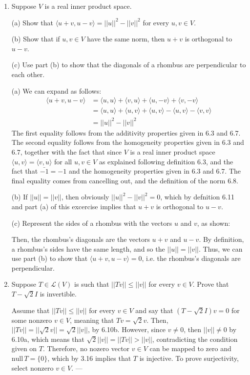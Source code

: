 \documentclass{book}
\begin{document}
\begin{enumerate}
\item Suppose \(V\) is a real inner product space.

(a) Show that \(\langle u+v,u-v \rangle = ||u||^2-||v||^2\) for every \(u,v \in V\).

(b) Show that if \(u,v \in V\) have the same norm, then \(u+v\) is orthogonal to \(u-v\).

(c) Use part (b) to show that the diagonals of a rhombus are perpendicular to each other.

(a) We can expand as follows: 
\begin{align*}
\langle u+v,u-v \rangle &= \langle u,u \rangle + \langle v,u \rangle + \langle u,-v \rangle + \langle v,-v \rangle \\
&= \langle u,u \rangle +\langle u,v \rangle + \langle u,v \rangle - \langle u,v \rangle - \langle v,v \rangle \\
&= ||u||^2 - ||v||^2
\end{align*}
The first equality follows from the additivity properties given in 6.3 and 6.7.  The second equality follows from the homogeneity properties given in 6.3 and 6.7, together with the fact that since \(V\) is a real inner product space \(\langle u,v \rangle = \langle v,u \rangle\) for all \(u,v \in V\) as explained following definition 6.3, and the fact that \(\bar{-1}=-1\) and the homogeneity properties given in 6.3 and 6.7.  The final equality comes from cancelling out, and the definition of the norm 6.8.

(b) If \(||u||=||v||\), then obviously \(||u||^2 - ||v||^2=0\), which by defnition 6.11 and part (a) of this excercise implies that \(u+v\) is orthogonal to \(u-v\).

(c) Represent the sides of a rhombus with the vectors \(u\) and \(v\), as shown:

Then, the rhombus's diagonals are the vectors \(u+v\) and \(u-v\).  By definition, a rhombus's sides have the same length, and so the \(||u||=||v||\).  Thus, we can use part (b) to show that \(\langle u+v,u-v \rangle=0\), i.e. the rhombus's diagonals are perpendicular.

\item Suppose \(T \in \mathcal{L}(V)\) is such that \(||Tv|| \leq ||v||\) for every \(v \in V\).  Prove that \(T - \sqrt{2}I\) is invertible.

Assume that \(||Tv|| \leq ||v||\) for every \(v \in V\) and say that \((T-\sqrt{2}I)v=0\) for some nonzero \(v \in V\), meaning that \(Tv=\sqrt{2}v\).  Then, \(||Tv||=||\sqrt{2}v||=\sqrt{2}||v||\), by 6.10b.  However, since \(v \neq 0\), then \(||v|| \neq 0\) by 6.10a, which means that \(\sqrt{2}||v||=||Tv|| > ||v||\), contradicting the condition given on \(T\).  Therefore, no nozero vector \(v \in V\) can be mapped to zero and \(\textrm{null} \, T = \{0\}\), which by 3.16 implies that \(T\) is injective.  To prove surjectivity, select nonzero \(v \in V\).  ---


\end{enumerate}
\end{document}
